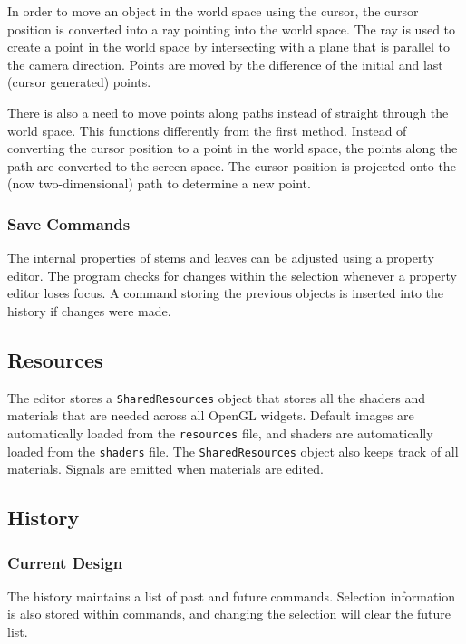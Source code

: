 \documentclass[11pt,letterpaper]{article}
\begin{document}
In order to move an object in the world space using the cursor, the cursor position is converted into a ray pointing into the world space. The ray is used to create a point in the world space by intersecting with a plane that is parallel to the camera direction. Points are moved by the difference of the initial and last (cursor generated) points.

There is also a need to move points along paths instead of straight through the world space. This functions differently from the first method. Instead of converting the cursor position to a point in the world space, the points along the path are converted to the screen space. The cursor position is projected onto the (now two-dimensional) path to determine a new point.

\subsubsection{Save Commands}

The internal properties of stems and leaves can be adjusted using a property editor. The program checks for changes within the selection whenever a property editor loses focus. A command storing the previous objects is inserted into the history if changes were made.

\subsection{Resources}

The editor stores a \texttt{SharedResources} object that stores all the shaders and materials that are needed across all OpenGL widgets. Default images are automatically loaded from the \texttt{resources} file, and shaders are automatically loaded from the \texttt{shaders} file. The \texttt{SharedResources} object also keeps track of all materials. Signals are emitted when materials are edited.

\subsection{History}

\subsubsection{Current Design}

The history maintains a list of past and future commands. Selection information is also stored within commands, and changing the selection will clear the future list.
\end{document}
